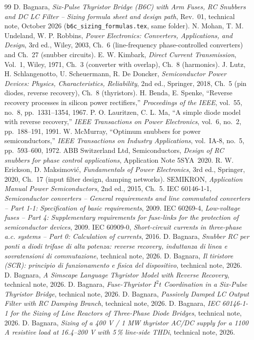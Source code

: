 \documentclass[10pt,a4paper]{scrartcl}
\begin{document}
\begin{thebibliography}{99}\small
{} D. Bagnara, \emph{Six-Pulse Thyristor Bridge (B6C) with Arm Fuses, RC Snubbers and DC LC Filter -- Sizing formula sheet and design path}, Rev.~01, technical note, October 2026 (\texttt{b6c\_sizing\_formulas.tex}, same folder).
 N. Mohan, T. M. Undeland, W. P. Robbins, \emph{Power Electronics: Converters, Applications, and Design}, 3rd ed., Wiley, 2003, Ch.~6 (line-frequency phase-controlled converters) and Ch.~27 (snubber circuits).
 E. W. Kimbark, \emph{Direct Current Transmission}, Vol.~1, Wiley, 1971, Ch.~3 (converter with overlap), Ch.~8 (harmonics).
 J. Lutz, H. Schlangenotto, U. Scheuermann, R. De Doncker, \emph{Semiconductor Power Devices: Physics, Characteristics, Reliability}, 2nd ed., Springer, 2018, Ch.~5 (pin diodes, reverse recovery), Ch.~8 (thyristors).
 H. Benda, E. Spenke, ``Reverse recovery processes in silicon power rectifiers,'' \emph{Proceedings of the IEEE}, vol.~55, no.~8, pp.~1331--1354, 1967.
 P. O. Lauritzen, C. L. Ma, ``A simple diode model with reverse recovery,'' \emph{IEEE Transactions on Power Electronics}, vol.~6, no.~2, pp.~188--191, 1991.
 W. McMurray, ``Optimum snubbers for power semiconductors,'' \emph{IEEE Transactions on Industry Applications}, vol.~IA-8, no.~5, pp.~593--600, 1972.
 ABB Switzerland Ltd, Semiconductors, \emph{Design of RC snubbers for phase control applications}, Application Note 5SYA~2020.
 R. W. Erickson, D. Maksimovi\'c, \emph{Fundamentals of Power Electronics}, 3rd ed., Springer, 2020, Ch.~17 (input filter design, damping networks).
 SEMIKRON, \emph{Application Manual Power Semiconductors}, 2nd ed., 2015, Ch.~5.
 IEC 60146-1-1, \emph{Semiconductor converters -- General requirements and line commutated converters -- Part 1-1: Specification of basic requirements}, 2009.
 IEC 60269-4, \emph{Low-voltage fuses -- Part 4: Supplementary requirements for fuse-links for the protection of semiconductor devices}, 2009.
 IEC 60909-0, \emph{Short-circuit currents in three-phase a.c. systems -- Part 0: Calculation of currents}, 2016.
 D. Bagnara, \emph{Snubber RC per ponti a diodi trifase di alta potenza: reverse recovery, induttanza di linea e sovratensioni di commutazione}, technical note, 2026.
 D. Bagnara, \emph{Il tiristore (SCR): principio di funzionamento e fisica del dispositivo}, technical note, 2026.
 D. Bagnara, \emph{A Simscape Language Thyristor Model with Reverse Recovery}, technical note, 2026.
 D. Bagnara, \emph{Fuse-Thyristor $I^2t$ Coordination in a Six-Pulse Thyristor Bridge}, technical note, 2026.
 D. Bagnara, \emph{Passively Damped LC Output Filter with RC Damping Branch}, technical note, 2026.
 D. Bagnara, \emph{IEC 60146-1-1 for the Sizing of Line Reactors of Three-Phase Diode Bridges}, technical note, 2026.
 D. Bagnara, \emph{Sizing of a 400 V / 1 MW thyristor AC/DC supply for a 1100 A resistive load at 16.4--200 V with 5\,\% line-side THDi}, technical note, 2026.
\end{thebibliography}
\end{document}
